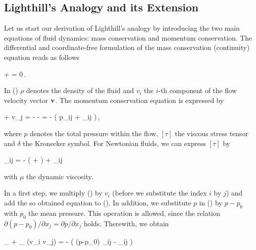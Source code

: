 \documentclass[a4paper,10pt]{article}
\begin{document}
\newpage
\subsection{Lighthill's Analogy and its Extension}
\label{sec:lighthill}

Let us start our derivation  of Lighthill's analogy by introducing the two
main  equations   of  fluid  dynamics:  mass   conservation  and  momentum
conservation. The differential and coordinate-free formulation of the mass
conservation (continuity) equation reads as follows

    +   = 0\,.
\ee

\noindent
In () $\rho$  denotes the density of the  fluid and $v_i$ the
$i$-th  component  of  the   flow  velocity  vector  ${\bf v}$.  The  momentum
conservation equation is expressed by

\rho{} + \rho v_j  = 
-  -  =
-  \left( p\delta_{ij} + \tau_{ij} \right)\,,
\ee

\noindent
where $p$ denotes the total pressure within the flow, $[\tau]$ the viscous
stress tensor and $\delta$ the Kronecker symbol.  For Newtonian fluids, we
can express $[\tau]$ by

\tau_{ij} = - \mu \left(  +
   \right)
+  \mu \delta_{ij}   
\ee

\noindent
with $\mu$ the dynamic viscosity.

In  a  first  step,  we  multiply  ()  by  $v_i$  (before  we
substitute  the index  $i$ by  $j$) and  add the  so obtained  equation to
(). In addition, we  substitute $p$ in () by
$p - p_0$  with $p_0$ the mean pressure. This  operation is allowed, since
the relation $\partial (p-p_0) /  \partial x_j = \partial p /\partial x_j$
holds. Therewith, we obtain

_{\displaystyle{}}
+ _{\displaystyle{} (\rho v_i v_j)}
= - ( (p-p_0) \delta_{ij} - \tau_{ij} )
\ee
\end{document}
